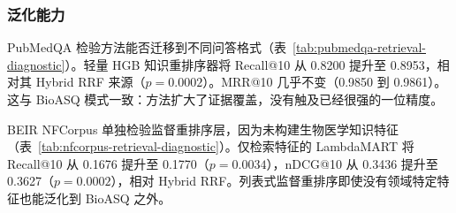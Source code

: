 

\subsubsection{泛化能力}

PubMedQA 检验方法能否迁移到不同问答格式（表~\ref{tab:pubmedqa-retrieval-diagnostic}）。轻量 HGB 知识重排序器将 Recall@10 从 0.8200 提升至 0.8953，相对其 Hybrid RRF 来源（$p=0.0002$）。MRR@10 几乎不变（0.9850 到 0.9861）。这与 BioASQ 模式一致：方法扩大了证据覆盖，没有触及已经很强的一位精度。



BEIR NFCorpus 单独检验监督重排序层，因为未构建生物医学知识特征（表~\ref{tab:nfcorpus-retrieval-diagnostic}）。仅检索特征的 LambdaMART 将 Recall@10 从 0.1676 提升至 0.1770（$p=0.0034$），nDCG@10 从 0.3436 提升至 0.3627（$p=0.0002$），相对 Hybrid RRF。列表式监督重排序即使没有领域特定特征也能泛化到 BioASQ 之外。


